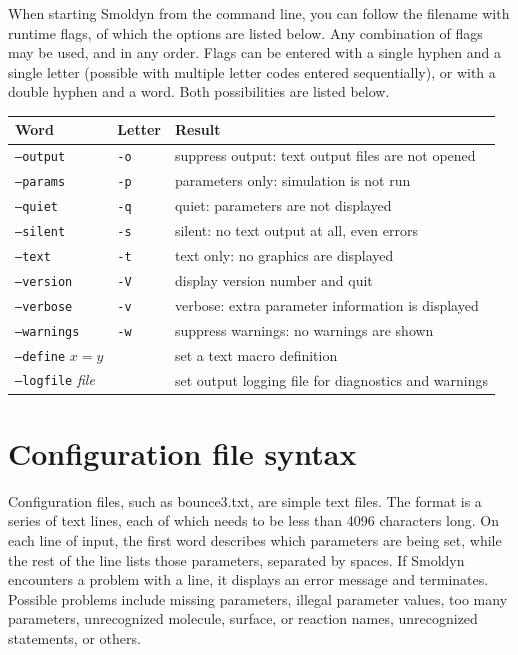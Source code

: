 \documentclass {scrbook}
\newcommand {\ttt} {\texttt}
\begin{document}
When starting Smoldyn from the command line, you can follow the filename with runtime flags, of which the options are listed below. Any combination of flags may be used, and in any order. Flags can be entered with a single hyphen and a single letter (possible with multiple letter codes entered sequentially), or with a double hyphen and a word. Both possibilities are listed below.

\begin{longtable}[c]{lll}
Word & Letter & Result\\
\hline
\ttt{--output} & \ttt{-o} & suppress output: text output files are not opened\\
\ttt{--params} & \ttt{-p} & parameters only: simulation is not run\\
\ttt{--quiet} & \ttt{-q} & quiet: parameters are not displayed\\
\ttt{--silent} & \ttt{-s} & silent: no text output at all, even errors\\
\ttt{--text} & \ttt{-t} & text only: no graphics are displayed\\
\ttt{--version} & \ttt{-V} & display version number and quit\\
\ttt{--verbose} & \ttt{-v} & verbose: extra parameter information is displayed\\
\ttt{--warnings} & \ttt{-w} & suppress warnings: no warnings are shown\\
\ttt{--define} $x=y$ &  & set a text macro definition\\
\ttt{--logfile} \textit{file} & & set output logging file for diagnostics and warnings
\end{longtable}

\section{Configuration file syntax}

Configuration files, such as bounce3.txt, are simple text files. The format is a series of text lines, each of which needs to be less than 4096 characters long. On each line of input, the first word describes which parameters are being set, while the rest of the line lists those parameters, separated by spaces. If Smoldyn encounters a problem with a line, it displays an error message and terminates. Possible problems include missing parameters, illegal parameter values, too many parameters, unrecognized molecule, surface, or reaction names, unrecognized statements, or others.
\end{document}
